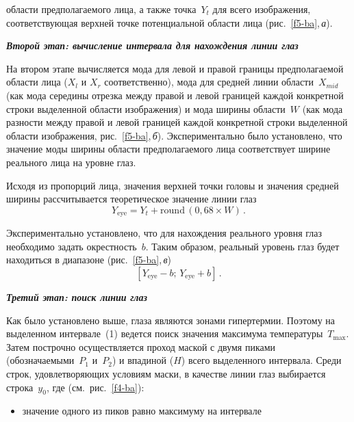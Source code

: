 \begin{multicols}{2}


\noindent
 области предполагаемого лица, а также точка~$Y_t$ для 
всего изображения, соответствующая верхней точке потенциальной области лица 
(рис.~\ref{f5-ba},\,\textit{а}).
  
  \medskip

  \noindent
    {\bfseries\textit{Второй этап: вычисление интервала для нахождения линии 
глаз}}
  
  \smallskip
  
  На втором этапе вычисляется мода для левой и правой границы 
предполагаемой области лица ($X_l$ и $X_r$ соответственно), мода для средней 
линии об\-ласти~$X_{mid}$ (как мода середины отрезка между правой и левой 
границей каждой конкретной строки выделенной области изображения) и мода 
ширины области~$W$ (как мода разности между правой и левой границей каждой 
конкретной строки выделенной области изображения, рис.~\ref{f5-ba},\,\textit{б}). 
Экспериментально было установлено, что значение моды ширины области 
предполагаемого лица соответствует ширине реального лица на уровне глаз.
  
  Исходя из пропорций лица, значения верхней точки головы и значения средней 
ширины рассчитывается теоретическое значение линии глаз
  $$
  Y_{\mathrm{eye}}= Y_t+\mathrm{round}\,\left(0{,}68\times W\right)\,.
  $$
  
  

  
  Экспериментально установлено, что для на\-хож\-де\-ния реального уровня глаз 
необходимо задать окрестность~$b$. Таким образом, реальный уровень глаз 
будет находиться в диапазоне (рис.~\ref{f5-ba},\,\textit{в})
  \begin{equation}
  \left [ Y_{\mathrm{eye}}-b;\, Y_{\mathrm{eye}}+b\right]\,.
  \label{e1-ba}
  \end{equation}
  

 


    \noindent
    {\bfseries\textit{Третий этап: поиск линии глаз}}
  \smallskip
  
  Как было установлено выше, глаза являются зонами гипертермии. Поэтому на 
выделенном интервале~(1) ведется поиск значения максимума 
температуры~$T_{\max}$. Затем построчно осуществляется проход маской с двумя 
пиками (обозначаемыми~$P_1$ и~$P_2$) и впадиной ($H$) всего выделенного 
интервала. Среди строк, удовлетворяющих условиям маски, в качестве линии глаз 
выбирается строка~$y_0$, где (см.\ рис.~\ref{f4-ba}):
  \begin{itemize}
\item значение одного из пиков равно максимуму на интервале


\end{itemize}
\end{multicols}
